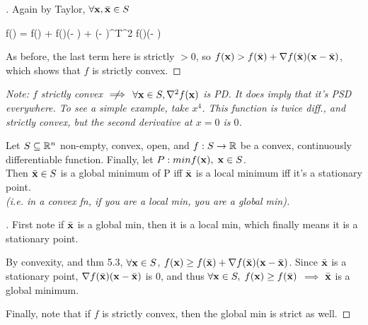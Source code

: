 \begin{proof}[]
Again by Taylor, $\forall \mathbf{x}, \bar{\mathbf{x}} \in S$
\begin{frml}
	f(\vx) = f(\bx) + \nabla f(\bx)(\vx - \bx)
	+ (\vx - \bx)^T\nabla^2 f(\vz)(\vz - \bx)
\end{frml}

As before, the last term here is strictly $> 0$, so $f(\mathbf{x}) > f(\bar{\mathbf{x}}) + 
\nabla f(\bar{\mathbf{x}}) (\mathbf{x} - \bar{\mathbf{x}})$, which shows that $f$ is strictly convex.
\end{proof}

\textit{Note: $f$ strictly convex $\notimplies$ $\forall \mathbf{x} \in S, \nabla^2 f(\mathbf{x})$ is 
PD. It \textit{does} imply that it's PSD everywhere.
To see a simple example, take $x^4$. This function is twice diff., and strictly
convex, but the second derivative at $x = 0$ is $0$.}


\begin{theo}{}{}
Let $S \subseteq \mathbb{R}^n$ non-empty, convex, open, and $f: S \rightarrow \mathbb{R}$
be a convex, continuously differentiable function. Finally, let 
$P: min f(\mathbf{x}), \; \mathbf{x} \in S$.
\medskip\\
Then $\bar{\mathbf{x}} \in S$ is a global minimum of P iff $\bar{\mathbf{x}}$ is a local minimum iff it's a
stationary point. 
\medskip\\
\textit{(i.e. in a convex fn, if you are a local min, you are
a global min).}
\end{theo}

\begin{proof}[]
First note if $\bar{\mathbf{x}}$ is a global min, then it is a local min, which finally 
means it is a stationary point.

By convexity, and thm 5.3, 
$\forall \mathbf{x} \in S$, $f(\mathbf{x}) \geq f(\bar{\mathbf{x}}) + \nabla f(\bar{\mathbf{x}}) (\mathbf{x} - \bar{\mathbf{x}})$.
Since $\bar{\mathbf{x}}$ is a stationary point, $\nabla f(\bar{\mathbf{x}}) (\mathbf{x} - \bar{\mathbf{x}})$ is $0$, and thus
$\forall \mathbf{x} \in S, \; f(\mathbf{x}) \geq f(\bar{\mathbf{x}})$ $\implies$ $\bar{\mathbf{x}}$ is a global minimum.

Finally, note that if $f$ is strictly convex, then the global min is strict as 
well.
\end{proof}

